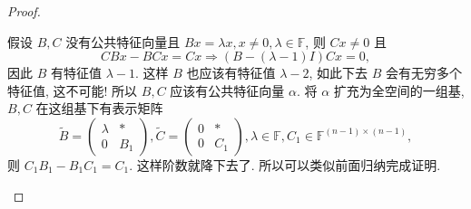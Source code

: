 \documentclass[../../main.tex]{subfiles}
\begin{document}
\begin{proof}
\begin{enumerate}
假设 \( B, C \) 没有公共特征向量且 \( Bx = \lambda x, x \neq 0, \lambda \in \mathbb{F} \), 则 \( Cx \neq 0 \) 且
\[
CBx - BCx = Cx \Rightarrow (B - (\lambda - 1)I)Cx = 0,
\]
因此 \( B \) 有特征值 \( \lambda - 1 \). 这样 \( B \) 也应该有特征值 \( \lambda - 2 \), 如此下去 \( B \) 会有无穷多个特征值, 这不可能! 所以 \( B, C \) 应该有公共特征向量 \( \alpha \). 将 \( \alpha \) 扩充为全空间的一组基, \( B, C \) 在这组基下有表示矩阵
\[
\widetilde{B} = \begin{pmatrix} \lambda & * \\ 0 & B_1 \end{pmatrix}, \widetilde{C} = \begin{pmatrix} 0 & * \\ 0 & C_1 \end{pmatrix}, \lambda \in \mathbb{F}, C_1 \in \mathbb{F}^{(n - 1) \times (n - 1)},
\]
则 \( C_1B_1 - B_1C_1 = C_1 \). 这样阶数就降下去了. 所以可以类似前面归纳完成证明.
\end{enumerate}
\end{proof}
\end{document}
